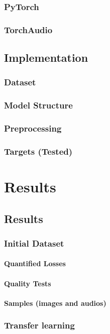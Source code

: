 \documentclass{book}
\begin{document}
\section{PyTorch}
\section{TorchAudio}
\chapter{Implementation}
\section{Dataset}
\section{Model Structure}
\section{Preprocessing}
\section{Targets (Tested)}


\part{Results}
\chapter{Results}
\section{Initial Dataset}
\subsection{Quantified Losses}
\subsection{Quality Tests}
\subsection{Samples (images and audios)}
\section{Transfer learning}
\end{document}
